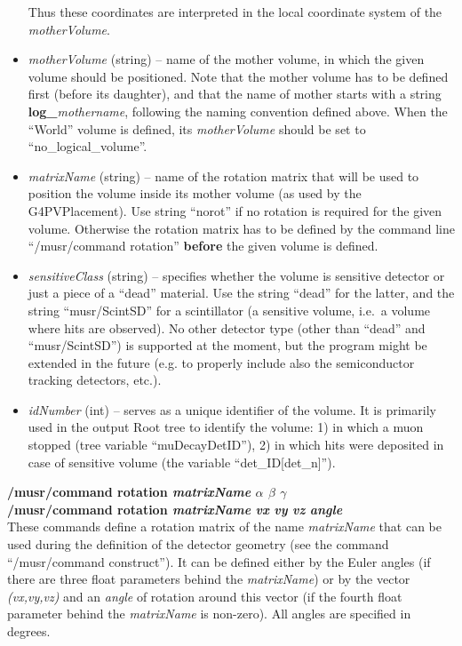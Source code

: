 \documentclass[twoside]{dis04}
\begin{document}
\begin{description}
\begin{itemize}
		     Thus these coordinates are interpreted in the local coordinate system of the \emph{motherVolume}.
	\item \emph{motherVolume} (string) -- name of the mother volume, in which the given volume should be
	             positioned.  Note that the mother volume has to be defined first (before its
                     daughter), and that the name of mother starts with a string {\bf log\_}\emph{mothername},
	             following the naming convention defined above.  
	             When the ``World'' volume is defined, its \emph{motherVolume} should be set to ``no\_logical\_volume''.
	\item \emph{matrixName} (string) -- name of the rotation matrix that will be used to position
	             the volume inside its mother volume (as used by the G4PVPlacement).  
	             Use string ``norot'' if no rotation is required for the given volume.
	             Otherwise the rotation matrix has to be defined by the command line 
	             ``/musr/command rotation'' {\bf before} the given volume is defined. 
        \item \emph{sensitiveClass} (string) -- specifies whether the volume is sensitive detector or
		     just a piece of a ``dead'' material.
	             Use the string ``dead'' for the latter,
	             and the string ``musr/ScintSD'' for a scintillator (a sensitive volume, i.e.\
                     a volume where hits are observed).  No other detector type
	             (other than ``dead'' and ``musr/ScintSD'') is supported at the moment, but
	             the program might be extended in the future (e.g. to properly include also the
	             semiconductor tracking detectors, etc.).
	\item \emph{idNumber} (int) -- serves as a unique identifier of the volume.  It is primarily
	             used in the output Root tree to identify the volume: 1) in which a muon stopped 
	             (tree variable ``muDecayDetID''), 
	             2) in which hits were deposited in case of sensitive volume 
                     (the variable ``det\_ID[det\_n]'').
	\end{itemize}	

\item{\bf /musr/command rotation \emph{matrixName} $\alpha$ $\beta$ $\gamma$} \\
	{\bf /musr/command rotation \emph{matrixName} \emph{vx} \emph{vy} \emph{vz} \emph{angle}}\\
	These commands define a rotation matrix of the name \emph{matrixName} that can be used
	during the definition of the detector geometry (see the command ``/musr/command construct'').
	It can be defined either by the Euler angles (if there are three float parameters behind the
        \emph{matrixName}) or by the vector \emph{(vx,vy,vz)} and an \emph{angle} of rotation around this
	vector (if the fourth float parameter behind the \emph{matrixName} is non-zero).
	All angles are specified in degrees.


\end{description}
\end{document}
